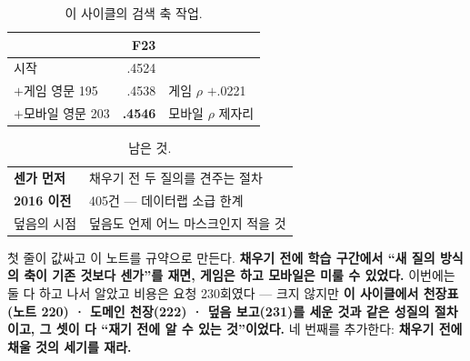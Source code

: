 \documentclass[10pt]{article}
\begin{document}

\begin{table}[t]
\centering\tsize
\caption{이 사이클의 검색 축 작업.}
\begin{tabular}{lrl}
\toprule
& F23 & \\
\midrule
시작 & .4524 & \\
$+$게임 영문 195 & .4538 & 게임 $\rho$ $+$.0221 \\
$+$모바일 영문 203 & \textbf{.4546} & 모바일 $\rho$ 제자리 \\
\bottomrule
\end{tabular}
\end{table}

\begin{table}[t]
\centering\tsize
\caption{남은 것.}
\begin{tabular}{ll}
\toprule
\textbf{센가 먼저} & 채우기 전 두 질의를 견주는 절차 \\
\textbf{2016 이전} & 405건 --- 데이터랩 소급 한계 \\
덮음의 시점 & 덮음도 언제 어느 마스크인지 적을 것 \\
\bottomrule
\end{tabular}
\end{table}

첫 줄이 값싸고 이 노트를 규약으로 만든다. \textbf{채우기 전에 학습
구간에서 ``새 질의 방식의 축이 기존 것보다 센가''를 재면, 게임은 하고
모바일은 미룰 수 있었다.} 이번에는 둘 다 하고 나서 알았고 비용은
요청 230회였다 --- 크지 않지만 \textbf{이 사이클에서 천장표(노트 220) ·
도메인 천장(222) · 덮음 보고(231)를 세운 것과 같은 성질의 절차이고,
그 셋이 다 ``재기 전에 알 수 있는 것''이었다.} 네 번째를 추가한다:
\textbf{채우기 전에 채울 것의 세기를 재라.}
\end{document}
